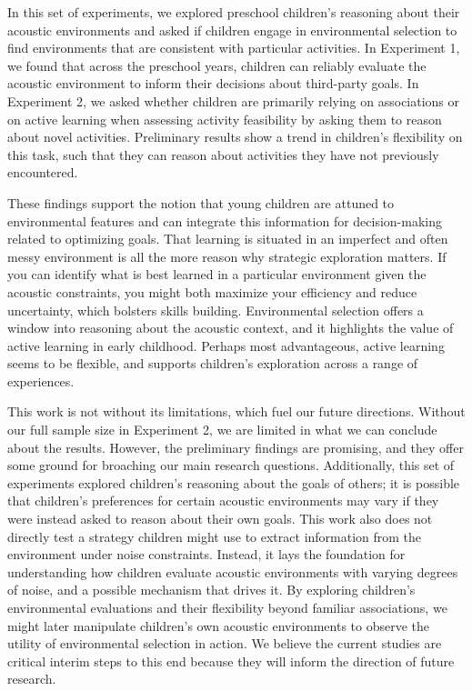 \documentclass[10pt, letterpaper]{article}
\begin{document}
In this set of experiments, we explored preschool children's reasoning
about their acoustic environments and asked if children engage in
environmental selection to find environments that are consistent with
particular activities. In Experiment 1, we found that across the
preschool years, children can reliably evaluate the acoustic environment
to inform their decisions about third-party goals. In Experiment 2, we
asked whether children are primarily relying on associations or on
active learning when assessing activity feasibility by asking them to
reason about novel activities. Preliminary results show a trend in
children's flexibility on this task, such that they can reason about
activities they have not previously encountered.

These findings support the notion that young children are attuned to
environmental features and can integrate this information for
decision-making related to optimizing goals. That learning is situated
in an imperfect and often messy environment is all the more reason why
strategic exploration matters. If you can identify what is best learned
in a particular environment given the acoustic constraints, you might
both maximize your efficiency and reduce uncertainty, which bolsters
skills building. Environmental selection offers a window into reasoning
about the acoustic context, and it highlights the value of active
learning in early childhood. Perhaps most advantageous, active learning
seems to be flexible, and supports children's exploration across a range
of experiences.

This work is not without its limitations, which fuel our future
directions. Without our full sample size in Experiment 2, we are limited
in what we can conclude about the results. However, the preliminary
findings are promising, and they offer some ground for broaching our
main research questions. Additionally, this set of experiments explored
children's reasoning about the goals of others; it is possible that
children's preferences for certain acoustic environments may vary if
they were instead asked to reason about their own goals. This work also
does not directly test a strategy children might use to extract
information from the environment under noise constraints. Instead, it
lays the foundation for understanding how children evaluate acoustic
environments with varying degrees of noise, and a possible mechanism
that drives it. By exploring children's environmental evaluations and
their flexibility beyond familiar associations, we might later
manipulate children's own acoustic environments to observe the utility
of environmental selection in action. We believe the current studies are
critical interim steps to this end because they will inform the
direction of future research.
\end{document}
